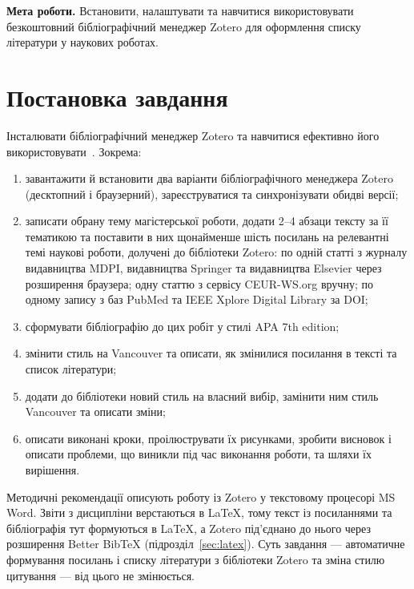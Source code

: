 \documentclass[14pt,a4paper]{extreport}
\begin{document}

\textbf{Мета роботи.} Встановити, налаштувати та навчитися використовувати безкоштовний бібліографічний менеджер Zotero для оформлення списку літератури у наукових роботах.

\section{Постановка завдання}

Інсталювати бібліографічний менеджер Zotero та навчитися ефективно його використовувати~\cite{guide}. Зокрема:

\begin{enumerate}
\item завантажити й встановити два варіанти бібліографічного менеджера Zotero~\cite{zotero} (десктопний і браузерний), зареєструватися та синхронізувати обидві версії;

\item записати обрану тему магістерської роботи, додати 2--4 абзаци тексту за її тематикою та поставити в них щонайменше шість посилань на релевантні темі наукові роботи, долучені до бібліотеки Zotero: по одній статті з журналу видавництва MDPI, видавництва Springer та видавництва Elsevier через розширення браузера; одну статтю з сервісу CEUR-WS.org вручну; по одному запису з баз PubMed та IEEE Xplore Digital Library за DOI;

\item сформувати бібліографію до цих робіт у стилі APA 7th edition;

\item змінити стиль на Vancouver та описати, як змінилися посилання в тексті та список літератури;

\item додати до бібліотеки новий стиль на власний вибір, замінити ним стиль Vancouver та описати зміни;

\item описати виконані кроки, проілюструвати їх рисунками, зробити висновок і описати проблеми, що виникли під час виконання роботи, та шляхи їх вирішення.
\end{enumerate}

Методичні рекомендації описують роботу із Zotero у текстовому процесорі MS Word. Звіти з дисципліни верстаються в LaTeX, тому текст із посиланнями та бібліографія тут формуються в LaTeX, а Zotero під'єднано до нього через розширення Better BibTeX (підрозділ~\ref{sec:latex}). Суть завдання — автоматичне формування посилань і списку літератури з бібліотеки Zotero та зміна стилю цитування — від цього не змінюється.
\end{document}
